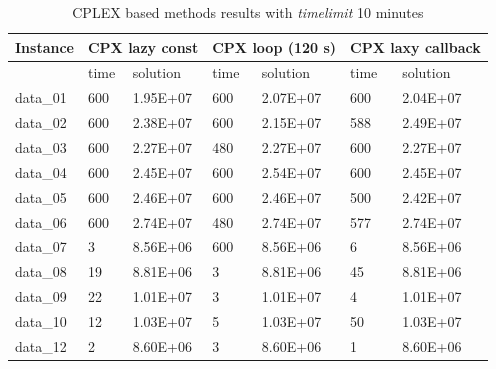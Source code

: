 \begin{table}[!h]
\caption{\textsc{CPLEX} based methods results with \textit{timelimit} 10 minutes}
\begin{tabular}{lllllll}
\hline
Instance & \multicolumn{2}{l}{\textbf{CPX lazy const}} & \multicolumn{2}{l}{\textbf{CPX loop (120 s)}} & \multicolumn{2}{l}{\textbf{CPX laxy callback}} \\ \hline
         & time               & solution               & time                & solution                & time                 & solution                \\ \hline
data\_01 & 600                & 1.95E+07               & 600                 & 2.07E+07                & 600                  & 2.04E+07                \\
data\_02 & 600                & 2.38E+07               & 600                 & 2.15E+07                & 588                  & 2.49E+07                \\
data\_03 & 600                & 2.27E+07               & 480                 & 2.27E+07                & 600                  & 2.27E+07                \\
data\_04 & 600                & 2.45E+07               & 600                 & 2.54E+07                & 600                  & 2.45E+07                \\
data\_05 & 600                & 2.46E+07               & 600                 & 2.46E+07                & 500                  & 2.42E+07                \\
data\_06 & 600                & 2.74E+07               & 480                 & 2.74E+07                & 577                  & 2.74E+07                \\
data\_07 & 3                  & 8.56E+06               & 600                 & 8.56E+06                & 6                    & 8.56E+06                \\
data\_08 & 19                 & 8.81E+06               & 3                   & 8.81E+06                & 45                   & 8.81E+06                \\
data\_09 & 22                 & 1.01E+07               & 3                   & 1.01E+07                & 4                    & 1.01E+07                \\
data\_10 & 12                 & 1.03E+07               & 5                   & 1.03E+07                & 50                   & 1.03E+07                \\
data\_12 & 2                  & 8.60E+06               & 3                   & 8.60E+06                & 1                    & 8.60E+06                \\

\end{tabular}
\end{table}
